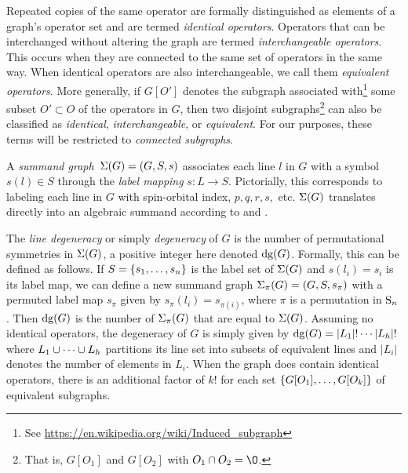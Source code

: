\documentclass[11pt]{article}
\numberwithin{equation}{section}
\begin{document}
\begin{dfn}\label{dfn:equivalent-subgraphs}
Repeated copies of the same operator are formally distinguished as elements of a graph's operator set and are termed \textit{identical operators}.
Operators that can be interchanged without altering the graph are termed \textit{interchangeable operators}.
This occurs when they are connected to the same set of operators in the same way.
When identical operators are also interchangeable, we call them \textit{equivalent operators}.
More generally, if $G[O']$ denotes the subgraph associated with\footnote{See \url{https://en.wikipedia.org/wiki/Induced_subgraph}} some subset $O'\subset O$ of the operators in $G$,
then two disjoint subgraphs\footnote{That is, $G[O_1]$ and $G[O_2]$ with $O_1\cap O_2=\O$.} can also be classified as \textit{identical}, \textit{interchangeable}, or \textit{equivalent}.
For our purposes, these terms will be restricted to \textit{connected subgraphs}.
\end{dfn}


\begin{dfn}
A \textit{summand graph}\footnotemark\ $\Sigma (G)=(G,S,s)$ associates each line $l$ in $G$ with a symbol $s(l)\in S$ through the \textit{label mapping} $s:L\rightarrow S$.
Pictorially, this corresponds to labeling each line in $G$ with spin-orbital index, $p,q,r,s,$ etc.
$\Sigma (G)$ translates directly into an algebraic summand according to  and .
\end{dfn}



\begin{dfn}
The \textit{line degeneracy} or simply \textit{degeneracy} of $G$ is the number of permutational symmetries in $\Sigma (G)$, a positive integer here denoted $\mathrm{dg}(G)$.
Formally, this can be defined as follows.
If $S=\{s_1,\ldots,s_n\}$ is the label set of $\Sigma (G)$ and $s(l_i)=s_i$ is its label map, we can define a new summand graph $\Si_{\pi}(G)=(G, S, s_{\pi})$ with a permuted label map $s_\pi$ given by $s_{\pi}(l_i)=s_{\pi(i)}$, where $\pi$ is a permutation in $\mathrm{S}_n$.
Then $\mathrm{dg}(G)$ is the number of $\Si_{\pi}(G)$ that are equal to $\Sigma (G)$.
Assuming no identical operators, the degeneracy of $G$ is simply given by $\mathrm{dg}(G)=|L_1|!\cdots|L_h|!$ where $L_1\cup\cdots\cup L_h$ partitions its line set into subsets of equivalent lines and $|L_i|$ denotes the number of elements in $L_i$.
When the graph does contain identical operators, there is an additional factor of $k!$ for each set $\{G[O_1],\ldots,G[O_k]\}$ of equivalent subgraphs.
\end{dfn}
\end{document}
